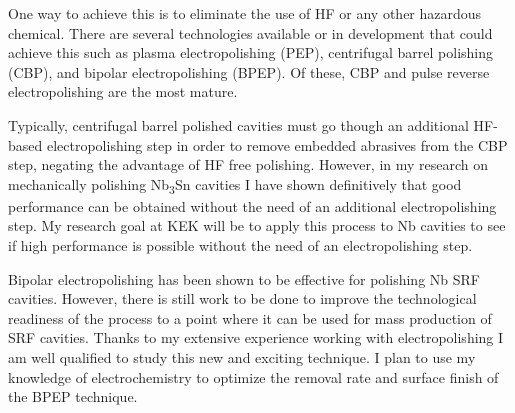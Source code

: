 \documentclass[]{revtex4-2}
\begin{document}
    One way to achieve this is to eliminate the use of HF or any other hazardous chemical. There are several technologies available or in development that could achieve this such as plasma electropolishing (PEP), centrifugal barrel polishing (CBP), and bipolar electropolishing (BPEP). Of these, CBP and pulse reverse electropolishing are the most mature.

    Typically, centrifugal barrel polished cavities must go though an additional HF-based electropolishing step in order to remove embedded abrasives from the CBP step, negating the advantage of HF free polishing. However, in my research on mechanically polishing Nb\textsubscript{3}Sn cavities I have shown definitively that good performance can be obtained without the need of an additional electropolishing step. My research goal at KEK will be to apply this process to Nb cavities to see if high performance is possible without the need of an electropolishing step.

    Bipolar electropolishing has been shown to be effective for polishing Nb SRF cavities. However, there is still work to be done to improve the technological readiness of the process to a point where it can be used for mass production of SRF cavities. Thanks to my extensive experience working with electropolishing I am well qualified to study this new and exciting technique. I plan to use my knowledge of electrochemistry to optimize the removal rate and surface finish of the BPEP technique. 



\end{document}
